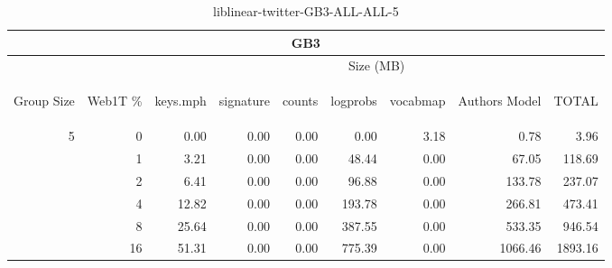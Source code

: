 \begin{center}
\begin{table}[htbp] 
 \begin{center}
\begin{tabular}{ | r | r | r | r | r | r | r | r | r |}
\hline
\multicolumn{9}{|c|}{GB3}\\
\hline
 & & \multicolumn{7}{|c|}{Size (MB)}\\ \cline{3-9}
\begin{sideways}Group Size\end{sideways} & \begin{sideways}Web1T \% \end{sideways} & \begin{sideways}keys.mph\end{sideways} & \begin{sideways}signature\end{sideways} & \begin{sideways}counts\end{sideways} & \begin{sideways}logprobs\end{sideways} & \begin{sideways}vocabmap\end{sideways} & \begin{sideways}Authors Model \end{sideways} & \begin{sideways}TOTAL\end{sideways}\\
\hline
\multirow{5}{*}{5}
 & 0 & 0.00 & 0.00 & 0.00 & 0.00 & 3.18 & 0.78 & 3.96\\ \cline{2-9}
 & 1 & 3.21 & 0.00 & 0.00 & 48.44 & 0.00 & 67.05 & 118.69\\ \cline{2-9}
 & 2 & 6.41 & 0.00 & 0.00 & 96.88 & 0.00 & 133.78 & 237.07\\ \cline{2-9}
 & 4 & 12.82 & 0.00 & 0.00 & 193.78 & 0.00 & 266.81 & 473.41\\ \cline{2-9}
 & 8 & 25.64 & 0.00 & 0.00 & 387.55 & 0.00 & 533.35 & 946.54\\ \cline{2-9}
 & 16 & 51.31 & 0.00 & 0.00 & 775.39 & 0.00 & 1066.46 & 1893.16\\ \cline{2-9}
\hline
\end{tabular}
\caption{liblinear-twitter-GB3-ALL-ALL-5}
\label{table:liblinear-twitter-GB3-ALL-ALL-5}
\end{center}
 \end{table}
\end{center}

